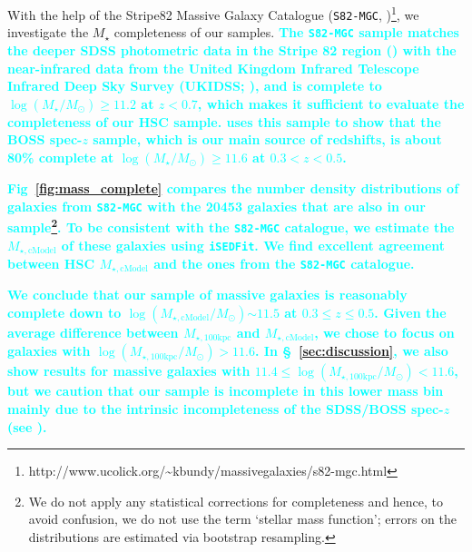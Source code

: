 \documentclass[fleqn,usenatbib]{mnras}
\def\msun{$M_\odot$}
\def\mstar{{$M_{\star}$}}
\def\logms{{$\log (M_{\star}/M_{\odot})$}}
\def\mtot{{$M_{\star,100\mathrm{kpc}}$}}
\def\mcmodel{{$M_{\star,\mathrm{cModel}}$}}
\def\logmtot{{$\log (M_{\star,100\mathrm{kpc}}/M_{\odot})$}}
\def\logmcmodel{{$\log (M_{\star,\mathrm{cModel}}/M_{\odot})$}}
\newcommand{\song}[1]{\textcolor{cyan}{\textbf{#1}}}
\begin{document}
    With the help of the Stripe82 Massive Galaxy Catalogue (\texttt{S82-MGC},
    \citealt{Bundy2015}
    )\footnote{http://www.ucolick.org/\~{}kbundy/massivegalaxies/s82-mgc.html}, 
    we investigate the \mstar{} completeness of our samples. 
    \song{
    The \texttt{S82-MGC} sample matches the deeper SDSS photometric data in the 
    Stripe 82 region (\citealt{Annis2014}) with the near-infrared data from the United 
    Kingdom Infrared Telescope Infrared Deep Sky Survey (UKIDSS; 
    \citealt{Lawrence2007}), and is complete to \logms{}$\geq 11.2$ at $z<0.7$, 
    which makes it sufficient to evaluate the completeness of our HSC sample. 
    \citet{Leauthaud2016} uses this sample to show that the BOSS spec-$z$ sample, 
    which is our main source of redshifts, is about 80\% complete at 
    \logms{}$\geq 11.6$ at $0.3 < z < 0.5$.
    } 
    
    \song{
    Fig~\ref{fig:mass_complete} compares the number density distributions of 
    galaxies from \texttt{S82-MGC} with the 20453 galaxies that are also in 
    our sample\footnote{We do not apply any statistical corrections for completeness 
    and hence, to avoid confusion, we do not use the term `stellar mass function';
    errors on the distributions are estimated via bootstrap resampling.}.
    To be consistent with the \texttt{S82-MGC} catalogue, we estimate the \mcmodel{}
    of these galaxies using \texttt{iSEDFit}.
    We find excellent agreement between HSC \mcmodel{} and the ones from the
    \texttt{S82-MGC} catalogue.
    }

    
    \song{
    We conclude that our sample of massive galaxies is reasonably complete down 
    to \logmcmodel{}${\sim} 11.5$ at $0.3 \leq z \leq 0.5$.    
    Given the average difference between \mtot{} and \mcmodel{}, we chose to focus on 
    galaxies with \logmtot{}$> 11.6$. 
    In \S~\ref{sec:discussion}, we also show results for massive galaxies 
    with $11.4 \le$\logmtot{}$<11.6$, but we caution that our sample is incomplete 
    in this lower mass bin mainly due to the intrinsic incompleteness of the 
    SDSS/BOSS spec-$z$ (see \citealt{Leauthaud2016}).
    }
    
\end{document}
